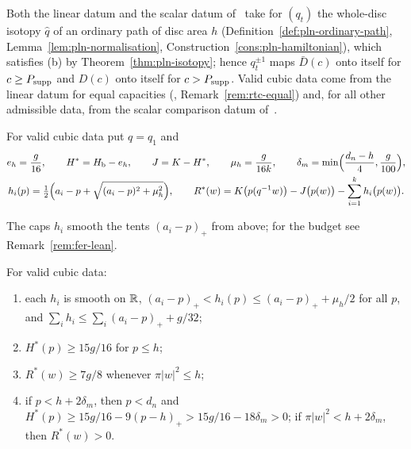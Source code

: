Both the linear datum and the scalar datum of~\cite{SongHD} take for $(q_t)$ the whole-disc isotopy $\hat q$ of an ordinary path of disc area $h$ (Definition~\ref{def:pln-ordinary-path}, Lemma~\ref{lem:pln-normalisation}, Construction~\ref{cons:pln-hamiltonian}), which satisfies (b) by Theorem~\ref{thm:pln-isotopy}; hence $q_t^{\pm1}$ maps $\bar D(c)$ onto itself for $c\ge P_{\rm supp}$ and $D(c)$ onto itself for $c>P_{\rm supp}$. Valid cubic data come from the linear datum for equal capacities (, Remark~\ref{rem:rtc-equal}) and, for all other admissible data, from the scalar comparison datum of~\cite{SongHD}.

\begin{definition}\label{def:shd4-scalars}
For valid cubic data put $q=q_1$ and
\[
\begin{gathered}
 e_h=\frac g{16},\qquad H^*=H_{\mathrm b}-e_h,\qquad J=K-H^*,\qquad \mu_h=\frac g{16k},\qquad
 \delta_m=\min\Bigl(\frac{d_n-h}4,\frac g{100}\Bigr),\\
 h_i(p)=\tfrac12\Bigl(a_i-p+\sqrt{(a_i-p)^2+\mu_h^2}\Bigr),\qquad
 R^*(w)=K\bigl(p(q^{-1}w)\bigr)-J\bigl(p(w)\bigr)-\sum_{i=1}^kh_i\bigl(p(w)\bigr).
\end{gathered}
\]
\end{definition}

The caps $h_i$ smooth the tents $(a_i-p)_+$ from above; for the budget see Remark~\ref{rem:fer-lean}.

\begin{lemma}\label{lem:shd4-budget}
For valid cubic data:
\begin{enumerate}[label=(\alph*)]
\item each $h_i$ is smooth on $\mathbb{R}$, $(a_i-p)_+<h_i(p)\le(a_i-p)_++\mu_h/2$ for all $p$, and
$\sum_ih_i\le\sum_i(a_i-p)_++g/32$;
\item $H^*(p)\ge15g/16$ for $p\le h$;
\item $R^*(w)\ge7g/8$ whenever $\pi|w|^2\le h$;
\item if $p<h+2\delta_m$, then $p<d_n$ and $H^*(p)\ge15g/16-9(p-h)_+>15g/16-18\delta_m>0$; if
$\pi|w|^2<h+2\delta_m$, then $R^*(w)>0$.
\end{enumerate}
\end{lemma}

